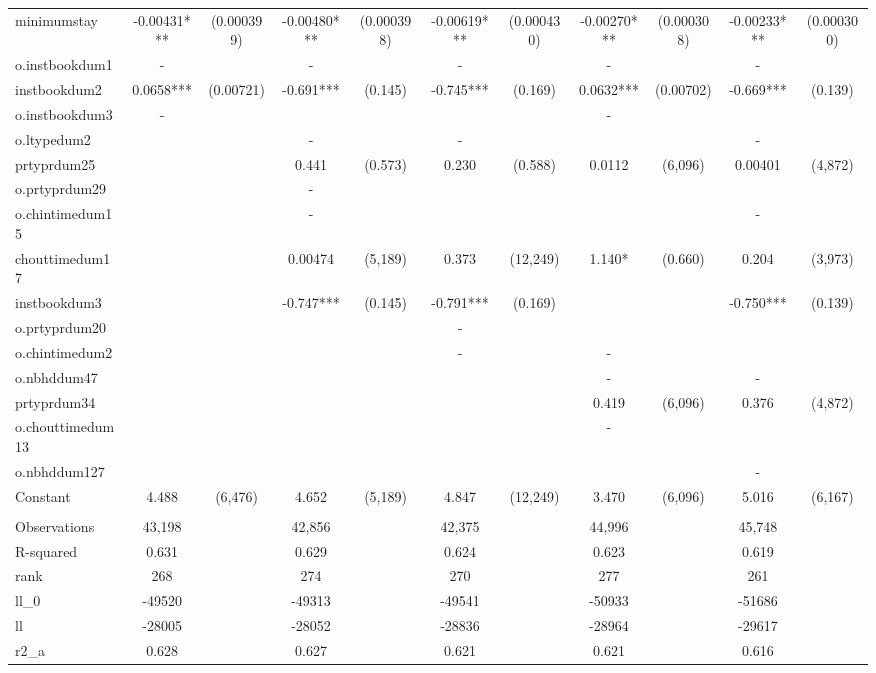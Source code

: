 \documentclass[]{article}
\begin{document}
\begin{tabular}{lcccccccccc}
minimumstay & -0.00431*** & (0.000399) & -0.00480*** & (0.000398) & -0.00619*** & (0.000430) & -0.00270*** & (0.000308) & -0.00233*** & (0.000300) \\
o.instbookdum1 & - &  & - &  & - &  & - &  & - &  \\
instbookdum2 & 0.0658*** & (0.00721) & -0.691*** & (0.145) & -0.745*** & (0.169) & 0.0632*** & (0.00702) & -0.669*** & (0.139) \\
o.instbookdum3 & - &  &  &  &  &  & - &  &  &  \\
o.ltypedum2 &  &  & - &  & - &  &  &  & - &  \\
prtyprdum25 &  &  & 0.441 & (0.573) & 0.230 & (0.588) & 0.0112 & (6,096) & 0.00401 & (4,872) \\
o.prtyprdum29 &  &  & - &  &  &  &  &  &  &  \\
o.chintimedum15 &  &  & - &  &  &  &  &  & - &  \\
chouttimedum17 &  &  & 0.00474 & (5,189) & 0.373 & (12,249) & 1.140* & (0.660) & 0.204 & (3,973) \\
instbookdum3 &  &  & -0.747*** & (0.145) & -0.791*** & (0.169) &  &  & -0.750*** & (0.139) \\
o.prtyprdum20 &  &  &  &  & - &  &  &  &  &  \\
o.chintimedum2 &  &  &  &  & - &  & - &  &  &  \\
o.nbhddum47 &  &  &  &  &  &  & - &  & - &  \\
prtyprdum34 &  &  &  &  &  &  & 0.419 & (6,096) & 0.376 & (4,872) \\
o.chouttimedum13 &  &  &  &  &  &  & - &  &  &  \\
o.nbhddum127 &  &  &  &  &  &  &  &  & - &  \\
Constant & 4.488 & (6,476) & 4.652 & (5,189) & 4.847 & (12,249) & 3.470 & (6,096) & 5.016 & (6,167) \\
 &  &  &  &  &  &  &  &  &  &  \\
Observations & 43,198 &  & 42,856 &  & 42,375 &  & 44,996 &  & 45,748 &  \\
R-squared & 0.631 &  & 0.629 &  & 0.624 &  & 0.623 &  & 0.619 &  \\
rank & 268 &  & 274 &  & 270 &  & 277 &  & 261 &  \\
ll\_0 & -49520 &  & -49313 &  & -49541 &  & -50933 &  & -51686 &  \\
ll & -28005 &  & -28052 &  & -28836 &  & -28964 &  & -29617 &  \\
r2\_a & 0.628 &  & 0.627 &  & 0.621 &  & 0.621 &  & 0.616 &  \\

\end{tabular}
\end{document}
